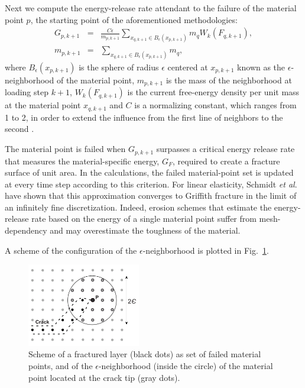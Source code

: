 \documentclass[applsci,journal,article,submit,moreauthors,pdftex]{Definitions/mdpi}
\begin{document}
Next we compute the energy-release rate attendant to the failure of the material point $p$, the starting point of the aforementioned methodologies:
\begin{eqnarray}
G_{p,k+1}&=&\frac{C\epsilon}{m_{p,k+1}}\sum_{x_{q,k+1}\in B_\epsilon (x_{p,k+1})}m_qW_k(F_{q,k+1}), \nonumber\\
m_{p,k+1}&=&\sum_{x_{q,k+1}\in B_\epsilon (x_{p,k+1})}m_q\label{eq10},
\end{eqnarray}
where $B_\epsilon (x_{p,k+1})$ is the sphere of radius $\epsilon$ centered at $x_{p,k+1}$ known as the $\epsilon$-neighborhood of the material point, $m_{p,k+1}$ is the mass of the neighborhood at loading step $k+1$, $W_k(F_{q,k+1})$ is the current free-energy density per unit mass at the material point $x_{q, k+1}$ and $C$ is a normalizing constant, which ranges from 1 to 2, in order to extend the influence from the first line of neighbors to the second \cite{schmidt09,Pandolfi_12}.

The material point is failed when $G_{p,k+1} $ surpasses a critical energy release rate that measures the material-specific energy, $G_F$, required to create a fracture surface of unit area. In the calculations, the failed material-point set is updated at every time step according to this criterion. For linear elasticity, Schmidt \textit{et al}.~\cite{schmidt09} have shown that this approximation converges to Griffith fracture in the limit of an infinitely fine discretization. 
Indeed, erosion schemes that estimate the energy-release rate based on the energy of a single material point suffer from mesh-dependency and may overestimate the toughness of the material.

A scheme of the configuration of the $\epsilon$-neighborhood is plotted in Fig.~\ref{fig3}.
\begin{figure}
\centering
\includegraphics[width=0.44\textwidth]{Figs/eroded_neighbors_2.pdf}
\caption{Scheme of a fractured layer (black dots) as set of failed material points, and of the $\epsilon$-neighborhood (inside the circle) of the material point located at the crack tip (gray dots).}
\label{fig3}
\end{figure}
\end{document}
